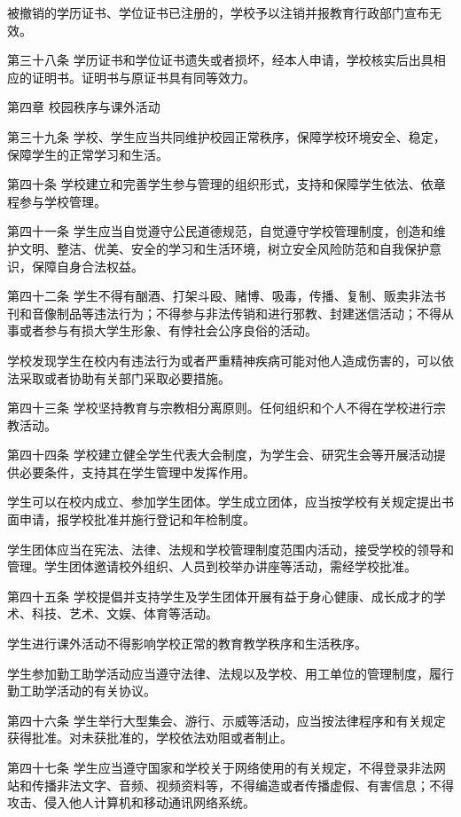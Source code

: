\documentclass[UTF8,12pt,a4paper]{report}
\begin{document}
被撤销的学历证书、学位证书已注册的，学校予以注销并报教育行政部门宣布无效。

第三十八条 学历证书和学位证书遗失或者损坏，经本人申请，学校核实后出具相应的证明书。证明书与原证书具有同等效力。



第四章 校园秩序与课外活动

第三十九条 学校、学生应当共同维护校园正常秩序，保障学校环境安全、稳定，保障学生的正常学习和生活。

第四十条 学校建立和完善学生参与管理的组织形式，支持和保障学生依法、依章程参与学校管理。

第四十一条 学生应当自觉遵守公民道德规范，自觉遵守学校管理制度，创造和维护文明、整洁、优美、安全的学习和生活环境，树立安全风险防范和自我保护意识，保障自身合法权益。

第四十二条 学生不得有酗酒、打架斗殴、赌博、吸毒，传播、复制、贩卖非法书刊和音像制品等违法行为；不得参与非法传销和进行邪教、封建迷信活动；不得从事或者参与有损大学生形象、有悖社会公序良俗的活动。

学校发现学生在校内有违法行为或者严重精神疾病可能对他人造成伤害的，可以依法采取或者协助有关部门采取必要措施。

第四十三条 学校坚持教育与宗教相分离原则。任何组织和个人不得在学校进行宗教活动。

第四十四条 学校建立健全学生代表大会制度，为学生会、研究生会等开展活动提供必要条件，支持其在学生管理中发挥作用。

学生可以在校内成立、参加学生团体。学生成立团体，应当按学校有关规定提出书面申请，报学校批准并施行登记和年检制度。

学生团体应当在宪法、法律、法规和学校管理制度范围内活动，接受学校的领导和管理。学生团体邀请校外组织、人员到校举办讲座等活动，需经学校批准。

第四十五条 学校提倡并支持学生及学生团体开展有益于身心健康、成长成才的学术、科技、艺术、文娱、体育等活动。

学生进行课外活动不得影响学校正常的教育教学秩序和生活秩序。

学生参加勤工助学活动应当遵守法律、法规以及学校、用工单位的管理制度，履行勤工助学活动的有关协议。

第四十六条 学生举行大型集会、游行、示威等活动，应当按法律程序和有关规定获得批准。对未获批准的，学校依法劝阻或者制止。

第四十七条 学生应当遵守国家和学校关于网络使用的有关规定，不得登录非法网站和传播非法文字、音频、视频资料等，不得编造或者传播虚假、有害信息；不得攻击、侵入他人计算机和移动通讯网络系统。
\end{document}

